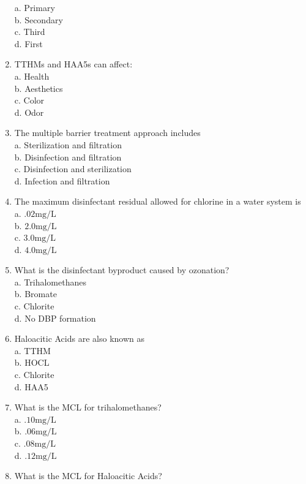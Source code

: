 \begin{enumerate}[1.]
a. Primary\\
b. Secondary\\
c. Third\\
d. First\\
\item TTHMs and HAA5s can affect:\\
a. Health\\
b. Aesthetics\\
c. Color\\
d. Odor\\
\item The multiple barrier treatment approach includes\\
a. Sterilization and filtration\\
b. Disinfection and filtration\\
c. Disinfection and sterilization\\
d. Infection and filtration\\
\item The maximum disinfectant residual allowed for chlorine in a water system is\\
a. $.02 \mathrm{mg} / \mathrm{L}$\\
b. $2.0 \mathrm{mg} / \mathrm{L}$\\
c. $3.0 \mathrm{mg} / \mathrm{L}$\\
d. $4.0 \mathrm{mg} / \mathrm{L}$\\
\item What is the disinfectant byproduct caused by ozonation?\\
a. Trihalomethanes\\
b. Bromate\\
c. Chlorite\\
d. No DBP formation\\
\item Haloacitic Acids are also known as\\
a. TTHM\\
b. HOCL\\
c. Chlorite\\
d. HAA5\\
\item What is the MCL for trihalomethanes?\\
a. $.10 \mathrm{mg} / \mathrm{L}$\\
b. $.06 \mathrm{mg} / \mathrm{L}$\\
c. $.08 \mathrm{mg} / \mathrm{L}$\\
d. $.12 \mathrm{mg} / \mathrm{L}$\\
\item What is the MCL for Haloacitic Acids?\\

\end{enumerate}
